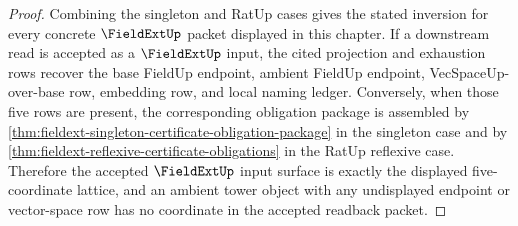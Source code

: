 \begin{proof}
Combining the singleton and RatUp cases gives the stated inversion for every
concrete $\FieldExtUp$ packet displayed in this chapter. If a downstream read
is accepted as a $\FieldExtUp$ input, the cited projection and exhaustion rows
recover the base FieldUp endpoint, ambient FieldUp endpoint,
VecSpaceUp-over-base row, embedding row, and local naming ledger. Conversely,
when those five rows are present, the corresponding obligation package is
assembled by \autoref{thm:fieldext-singleton-certificate-obligation-package} in
the singleton case and by \autoref{thm:fieldext-reflexive-certificate-obligations}
in the RatUp reflexive case. Therefore the accepted $\FieldExtUp$ input surface
is exactly the displayed five-coordinate lattice, and an ambient tower object
with any undisplayed endpoint or vector-space row has no coordinate in the
accepted readback packet.
\end{proof}
